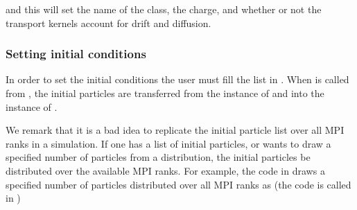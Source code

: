 \documentclass[letterpaper,10pt,english]{sphinxmanual}
\begin{document}
\sphinxAtStartPar
and this will set the name of the class, the charge, and whether or not the transport kernels account for drift and diffusion.


\subsubsection{Setting initial conditions}
\label{\detokenize{Solvers/Ito:setting-initial-conditions}}
\sphinxAtStartPar
In order to set the initial conditions the user must fill the list  in .
When  is called from , the initial particles are transferred from the instance of  and into the instance of .

\sphinxAtStartPar
We remark that it is a bad idea to replicate the initial particle list over all MPI ranks in a simulation.
If one has a list of initial particles, or wants to draw a specified number of particles from a distribution, the initial particles  be distributed over the available MPI ranks.
For example, the code in  draws a specified number of particles distributed over all MPI ranks as (the code is called in )
\end{document}
